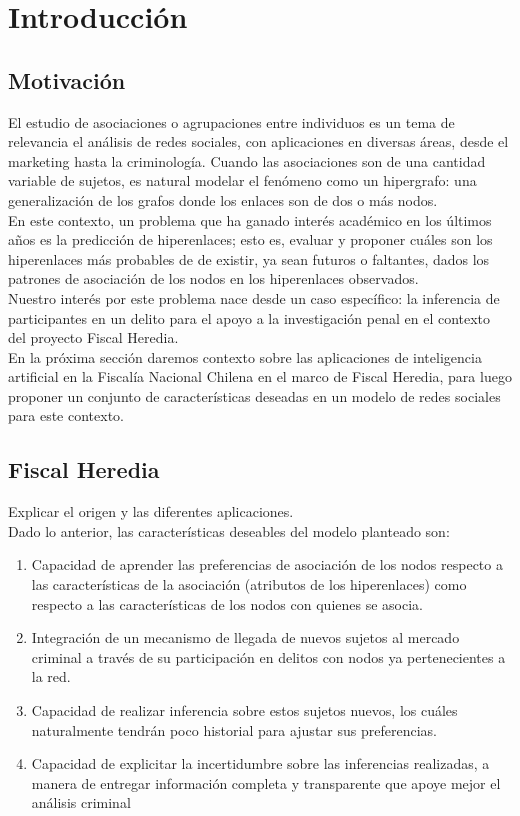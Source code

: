 \chapter{Introducción}

\section{Motivación}

El estudio de asociaciones o agrupaciones entre individuos es un tema de relevancia el análisis de redes sociales, con aplicaciones en diversas áreas, desde el marketing hasta la criminología. Cuando las asociaciones son de una cantidad variable de sujetos, es natural modelar el fenómeno como un hipergrafo: una generalización de los grafos donde los enlaces son de dos o más nodos.\\

En este contexto, un problema que ha ganado interés académico en los últimos años es la predicción de hiperenlaces; esto es, evaluar y proponer cuáles son los hiperenlaces más probables de de existir, ya sean futuros o faltantes, dados los patrones de asociación de los nodos en los hiperenlaces observados.\\

Nuestro interés por este problema nace desde un caso específico: la inferencia de participantes en un delito para el apoyo a la investigación penal en el contexto del proyecto Fiscal Heredia.\\

En la próxima sección daremos contexto sobre las aplicaciones de inteligencia artificial en la Fiscalía Nacional Chilena en el marco de Fiscal Heredia, para luego proponer un conjunto de características deseadas en un modelo de redes sociales para este contexto.

\section{Fiscal Heredia}

Explicar el origen y las diferentes aplicaciones.\\

Dado lo anterior, las características deseables del modelo planteado son:
\begin{enumerate}
\item Capacidad de aprender las preferencias de asociación de los nodos respecto a las características de la asociación (atributos de los hiperenlaces) como respecto a las características de los nodos con quienes se asocia.
\item Integración de un mecanismo de llegada de nuevos sujetos al mercado criminal a través de su participación en delitos con nodos ya pertenecientes a la red.
\item Capacidad de realizar inferencia sobre estos sujetos nuevos, los cuáles naturalmente tendrán poco historial para ajustar sus preferencias.
\item Capacidad de explicitar la incertidumbre sobre las inferencias realizadas, a manera de entregar información completa y transparente que apoye mejor el análisis criminal
\end{enumerate}


